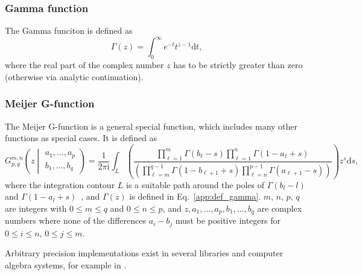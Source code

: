 \subsubsection*{Gamma function}
The Gamma funciton is defined as~\cite[Eq.~5.2.1]{NIST:DLMF}
\begin{equation}
\label{app:def_gamma}
\Gamma\left(z\right)=\int_{0}^{\infty}e^{-t}t^{z-1}\mathrm{d}t,
\end{equation}
where the real part of the complex number $z$ has to be strictly greater than zero (otherwise via analytic continuation).
\subsubsection*{Meijer G-function}
The Meijer G-function is a general special function, which includes many other functions as special cases. It is defined as
\begin{equation}
\label{app:def_meijerG}
G^{m,n}_{p,q}\left(z\middle|
\begin{matrix}
a_1,...,a_p\\
b_1,...,b_q
\end{matrix}
\right)
=
\frac{1}{2\pi\mathrm{i}}\int_{L%
}\left({\textstyle\frac{\prod\limits_{\ell=1}^{m}\Gamma\left(b_{\ell}-s\right%
)\prod\limits_{\ell=1}^{n}\Gamma\left(1-a_{\ell}+s\right)}{\left(\prod\limits_%
{\ell=m}^{q-1}\Gamma\left(1-b_{\ell+1}+s\right)\prod\limits_{\ell=n}^{p-1}%
\Gamma\left(a_{\ell+1}-s\right)\right)}}\right)z^{s}\mathrm{d}s,
\end{equation}
where the integration contour $L$ is a suitable path around the poles of $\Gamma(b_l-l)$ and \mbox{$\Gamma(1-a_l+s)$}~\cite[Eq.~16.17.1]{NIST:DLMF}, and $\Gamma(z)$ is defined in Eq.~\eqref{app:def_gamma}. $m$, $n$, $p$, $q$ are integers with $0 \leq m \leq q$ and $0 \leq n \leq p$, and $z,a_1,...,a_p,b_1,...,b_q$ are complex numbers where none of the differences $a_i-b_j$ must be positive integers for $0\leq i \leq n$, $0\leq j \leq m$.

Arbitrary precision implementations exist in several libraries and computer algebra systems, for example in \cite{mpmath,Mathematica}.

